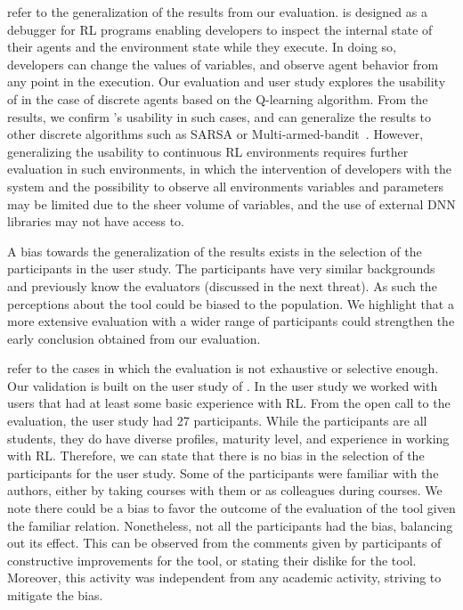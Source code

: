 \begin{description}[leftmargin=0.1cm, labelindent=0.1cm]
\item[Threats to external validity] refer to the generalization of the results from our evaluation. 
\flik is designed as a debugger for \ac{RL} programs enabling developers to inspect the internal state 
of their agents and the environment state while they execute. In doing so, developers can change the 
values of variables, and observe agent behavior from any point in the execution. Our evaluation and 
user study explores the usability of \flik in the case of discrete agents based on the Q-learning 
algorithm. From the results, we confirm \flik's usability in such cases, and can generalize the results 
to other discrete algorithms such as SARSA or Multi-armed-bandit~\cite{lattimore20}. However, 
generalizing the usability to continuous \ac{RL} environments requires further evaluation in such 
environments, in which the intervention of developers with the system and the possibility to 
observe all environments variables and parameters may be limited due to the sheer volume of 
variables, and the use of external \acl{DNN} libraries \flik may not have access to.

A bias towards the generalization of the results exists in the selection of the participants in the user 
study. The participants have very similar backgrounds and previously know the evaluators (discussed 
in the next threat). As such the perceptions about the tool could be biased to the population. We 
highlight that a more extensive evaluation with a wider range of participants could strengthen the 
early conclusion obtained from our evaluation.

\item[Threats to construct validity] refer to the cases in which the evaluation is not exhaustive 
or selective enough. Our validation is built on the user study of \flik. In the user study we worked
with users that had at least some basic experience with \ac{RL}. From the open call to the 
evaluation, the user study had 27 participants. While the participants are all students, they do have
diverse profiles, maturity level, and experience in working with \ac{RL}. Therefore, we can state that 
there is no bias in the selection of the participants for the user study. Some of the participants were 
familiar with the authors, either by taking courses with them or as colleagues during courses. We 
note there could be a bias to favor the outcome of the evaluation of the tool given the familiar 
relation. Nonetheless, not all the participants had the bias, balancing out its effect. This can be 
observed from the comments given by participants of constructive improvements for the tool, or 
stating their dislike for the tool. Moreover, this activity was independent from any academic activity, 
striving to mitigate the bias.


\end{description}
